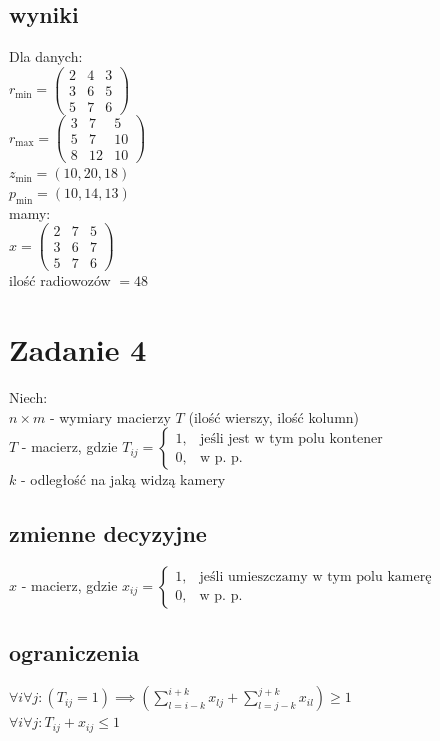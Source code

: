 \documentclass{report}
\begin{document}
\subsection*{wyniki}
Dla danych:\\
$r_{\text{min}} = \begin{pmatrix}
    2 & 4 & 3 \\
    3 & 6 & 5 \\
    5 & 7 & 6 
    \end{pmatrix}$\\
$r_{\text{max}} = \begin{pmatrix}
    3 & 7 & 5 \\
    5 & 7 & 10 \\
    8 & 12 & 10
    \end{pmatrix}$\\
$z_{\text{min}} = (10, 20, 18)$\\
$p_{\text{min}} = (10, 14, 13)$\\
mamy:\\
$x = \begin{pmatrix}
2 & 7 & 5 \\
3 & 6 & 7 \\
5 & 7 & 6 
\end{pmatrix}$\\
ilość radiowozów $ = 48$

\section*{Zadanie 4}
Niech:\\
$n\times m$ - wymiary macierzy $T$ (ilość wierszy, ilość kolumn)\\
$T$ - macierz, gdzie
$T_{ij} = \begin{cases} 1, & \text{jeśli jest w tym polu kontener} \\ 0, & \text{w p. p.} \end{cases}$\\
$k$ - odległość na jaką widzą kamery
\subsection*{zmienne decyzyjne}
$x$ - macierz, gdzie
$x_{ij} = \begin{cases} 1, & \text{jeśli umieszczamy w tym polu kamerę} \\ 0, & \text{w p. p.} \end{cases}$\\
\subsection*{ograniczenia}
$\forall i \forall j : (T_{ij} = 1) \implies (\sum_{l = i-k}^{i+k}x_{lj} + \sum_{l = j-k}^{j + k}x_{il})\ge1$\\
$\forall i \forall j : T_{ij} + x_{ij} \le 1$
\end{document}
